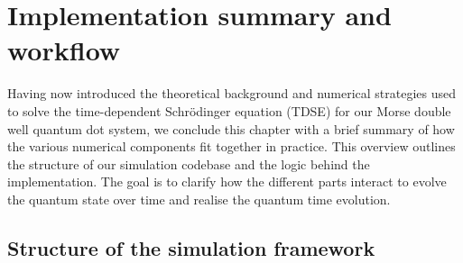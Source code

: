 \documentclass{subfiles}
\begin{document}
\section{Implementation summary and workflow}\label{sec:summary_workflow}
Having now introduced the theoretical background and numerical strategies used to solve the time-dependent Schrödinger equation (TDSE) for our Morse double well quantum dot system, we conclude this chapter with a brief summary of how the various numerical components fit together in practice. This overview outlines the structure of our simulation codebase and the logic behind the implementation. The goal is to clarify how the different parts interact to evolve the quantum state over time and realise the quantum time evolution. 
\subsection*{Structure of the simulation framework}
\end{document}
